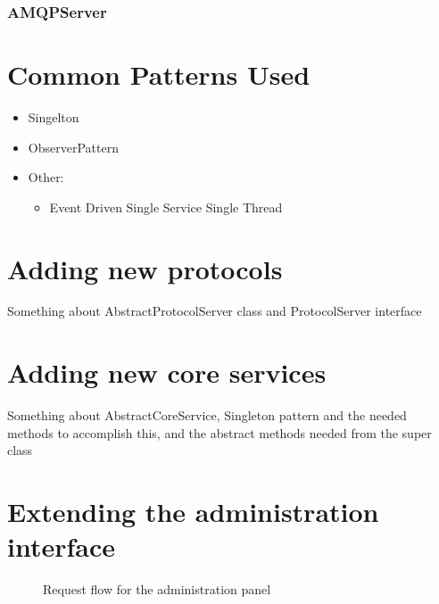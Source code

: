 \subsubsection{AMQPServer}

\section{Common Patterns Used}
\label{sec:common-patterns-used}

\begin{itemize}
\item Singelton
\item ObserverPattern
\item Other: \begin{itemize}
\item Event Driven Single Service Single Thread
\end{itemize}
\end{itemize}

\section{Adding new protocols}

Something about AbstractProtocolServer class and ProtocolServer interface

\section{Adding new core services}
\label{sec:adding-new-core-services}

Something about AbstractCoreService, Singleton pattern and the needed methods to accomplish this, and the abstract methods needed from the super class

\section{Extending the administration interface}
\label{sec:adding-new-panes}

\begin{center}
  \begin{figure}[ht!]
    \caption{Request flow for the administration panel}
    \label{fig:oac-request-flow}
  \end{figure}
\end{center}


